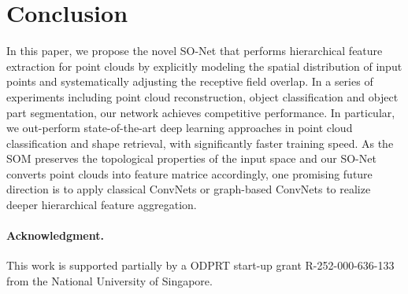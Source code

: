 \documentclass[10pt,twocolumn,letterpaper]{article}
\begin{document}
\section{Conclusion} \label{sec_conclusion}
In this paper, we propose the novel SO-Net that performs hierarchical feature extraction for point clouds by explicitly modeling the spatial distribution of input points and systematically adjusting the receptive field overlap. In a series of experiments including point cloud reconstruction, object classification and object part segmentation, our network achieves competitive performance. In particular, we out-perform state-of-the-art deep learning approaches in point cloud classification and shape retrieval, with significantly faster training speed. As the SOM preserves the topological properties of the input space and our SO-Net converts point clouds into feature matrice accordingly, one promising future direction is to apply classical ConvNets or graph-based ConvNets to realize deeper hierarchical feature aggregation.


\vspace{-8pt}
\paragraph{Acknowledgment.} \label{sec_ack}
This work is supported partially by a ODPRT start-up grant R-252-000-636-133 from the National University of Singapore.


%


{\small


}










\newpage
\end{document}
